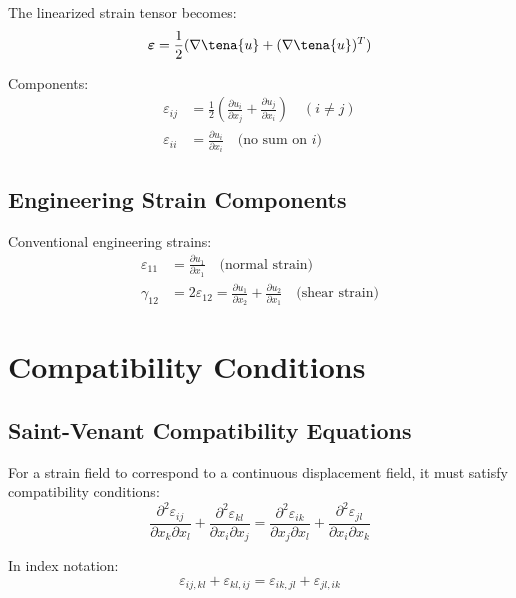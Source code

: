 The linearized strain tensor becomes:
\begin{equation}
\boldsymbol{\varepsilon} = \frac{1}{2}(\nabla \tena{u} + (\nabla \tena{u})^T)
\end{equation}

Components:
\begin{align}
\varepsilon_{ij} &= \frac{1}{2}\left(\frac{\partial u_i}{\partial x_j} + \frac{\partial u_j}{\partial x_i}\right) \quad (i \neq j) \\
\varepsilon_{ii} &= \frac{\partial u_i}{\partial x_i} \quad \text{(no sum on } i \text{)}
\end{align}

\subsection{Engineering Strain Components}

Conventional engineering strains:
\begin{align}
\varepsilon_{11} &= \frac{\partial u_1}{\partial x_1} \quad \text{(normal strain)} \\
\gamma_{12} &= 2\varepsilon_{12} = \frac{\partial u_1}{\partial x_2} + \frac{\partial u_2}{\partial x_1} \quad \text{(shear strain)}
\end{align}

\section{Compatibility Conditions}

\subsection{Saint-Venant Compatibility Equations}

For a strain field to correspond to a continuous displacement field, it must satisfy compatibility conditions:
\begin{equation}
\frac{\partial^2 \varepsilon_{ij}}{\partial x_k \partial x_l} + \frac{\partial^2 \varepsilon_{kl}}{\partial x_i \partial x_j} = \frac{\partial^2 \varepsilon_{ik}}{\partial x_j \partial x_l} + \frac{\partial^2 \varepsilon_{jl}}{\partial x_i \partial x_k}
\end{equation}

In index notation:
\begin{equation}
\varepsilon_{ij,kl} + \varepsilon_{kl,ij} = \varepsilon_{ik,jl} + \varepsilon_{jl,ik}
\end{equation}

